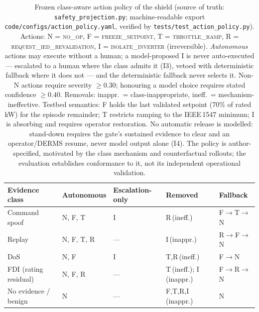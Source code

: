 \begin{table}[t]
\centering\small
\caption{Frozen class-aware action policy of the shield (source of truth:
\texttt{safety\_projection.py}; machine-readable export
\texttt{code/configs/action\_policy.yaml}, verified by
\texttt{tests/test\_action\_policy.py}). Actions: N = \textsc{no\_op},
F = \textsc{freeze\_setpoint}, T = \textsc{throttle\_ramp}, R =
\textsc{request\_ied\_revalidation}, I = \textsc{isolate\_inverter}
(irreversible). \emph{Autonomous} actions may execute without a human; a
model-proposed I is never auto-executed --- escalated to a human where the
class admits it (I3), vetoed with deterministic fallback where it does not
--- and the deterministic fallback never selects it. Non-N actions require
severity $\geq 0.30$; honouring a model choice requires stated confidence
$\geq 0.40$. Removals: inappr.\ = class-inappropriate, ineff.\ =
mechanism-ineffective. Testbed semantics: F holds the last validated
setpoint (70\% of rated kW) for the episode remainder; T restricts ramping
to the IEEE\,1547 minimum; I is absorbing and requires operator
restoration. No automatic release is modelled: stand-down requires the
gate's sustained evidence to clear and an operator/DERMS resume, never
model output alone (I4). The policy is author-specified, motivated by the
class mechanism and counterfactual rollouts; the evaluation establishes
conformance to it, not its independent operational validation.}
\label{tab:action-policy}
\footnotesize\setlength{\tabcolsep}{4pt}
\begin{tabular}{lllll}
\toprule
Evidence class & Autonomous & Escalation-only & Removed & Fallback \\
\midrule
Command spoof & N, F, T & I & R\,(ineff.) & F$\rightarrow$T$\rightarrow$N \\
Replay & N, F, T, R & --- & I\,(inappr.) & R$\rightarrow$F$\rightarrow$N \\
DoS & N, F & I & T,R\,(ineff.) & F$\rightarrow$N \\
FDI (rating residual) & N, F, R & --- & T\,(ineff.); I\,(inappr.) & F$\rightarrow$R$\rightarrow$N \\
No evidence / benign & N & --- & F,T,R,I\,(inappr.) & N \\
\bottomrule
\end{tabular}
\end{table}
